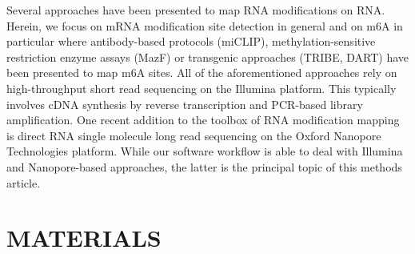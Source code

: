 \documentclass[times, 11pt, a4paper]{article}
\begin{document}
Several approaches have been presented to map RNA modifications on RNA. Herein, we focus on mRNA modification site detection in general and on m6A in particular where antibody-based protocols (miCLIP), methylation-sensitive restriction enzyme assays (MazF) or transgenic approaches (TRIBE, DART) have been presented to map m6A sites. All of the aforementioned approaches rely on high-throughput short read sequencing on the Illumina platform. This typically involves cDNA synthesis by reverse transcription and PCR-based library amplification. One recent addition to the toolbox of RNA modification mapping is direct RNA single molecule long read sequencing on the Oxford Nanopore Technologies platform. While our software workflow is able to deal with Illumina and Nanopore-based approaches, the latter is the principal topic of this methods article.

\section*{MATERIALS}
\end{document}
